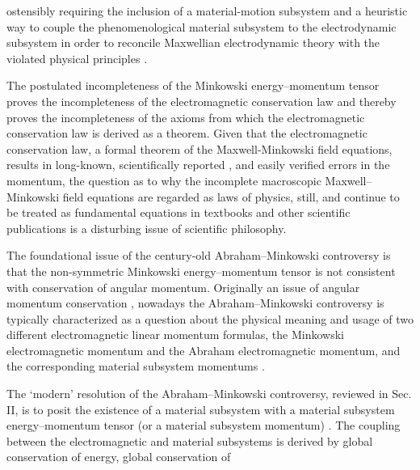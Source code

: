\documentclass[twocolumn,amssymb,eqsecnum,aps,pra]{revtex4-2}
\begin{document}
ostensibly requiring the inclusion of a material-motion subsystem and a
heuristic way to couple the phenomenological material subsystem to the
electrodynamic subsystem in order to reconcile Maxwellian electrodynamic
theory with the violated physical principles 
\cite{BIRL,BIBoydMil,BIPfei,BIAMC4,BIKemplatest,BIPenHaus,BIGord,BIBarn,BIBarnLou,BIKranys,BIObukPLA,BIBrevCons}.
\par
The postulated incompleteness of the Minkowski energy--momentum
tensor proves the incompleteness of the electromagnetic conservation
law and thereby proves the incompleteness of the axioms from which the 
electromagnetic conservation law is derived as a theorem.
Given that the electromagnetic conservation law, a formal theorem
of the Maxwell-Minkowski field equations, results in
long-known, scientifically reported
\cite{BIRL,BIBoydMil,BIPfei,BIAMC4,BIKemplatest,BIPenHaus,BIGord,BIBarn,BIBarnLou,BIKranys,BIObukPLA,BIBrevCons},
and easily verified errors in the momentum, the question as to
why the incomplete macroscopic Maxwell--Minkowski field equations are
regarded as laws of physics, still, and continue to be treated as
fundamental equations in textbooks and other scientific publications
is a disturbing issue of scientific philosophy.
\par
The foundational issue \cite{BIMin,BIAbr} of the century-old
Abraham--Minkowski controversy
\cite{BIRL,BIBoydMil,BIPfei,BIAMC4,BIKemplatest,BIPenHaus,BIGord,BIBarn,BIBarnLou,BIKranys,BIObukPLA,BIBrevCons}
is that the non-symmetric Minkowski energy--momentum tensor
is not consistent with conservation of angular momentum.
Originally an issue of angular momentum
conservation \cite{BIMin,BIAbr}, nowadays the Abraham--Minkowski
controversy is typically characterized as a question about the
physical meaning and usage of two different electromagnetic linear 
momentum formulas, the Minkowski electromagnetic momentum and the
Abraham electromagnetic momentum, and the corresponding material
subsystem momentums
\cite{BIRL,BIBoydMil,BIPfei,BIAMC4,BIKemplatest,BIPenHaus,BIGord,BIBarn,BIBarnLou,BIKranys,BIObukPLA,BIBrevCons,BIBrev}.
\par
The `modern' resolution of the Abraham--Minkowski controversy,
reviewed in Sec. II, is to
posit the existence of a material subsystem with a material subsystem 
energy--momentum tensor (or a material subsystem momentum)
\cite{BIRL,BIBoydMil,BIPfei,BIAMC4,BIKemplatest,BIPenHaus,BIGord,BIBarn,BIBarnLou,BIKranys,BIObukPLA,BIBrevCons}.
The coupling between the electromagnetic and material subsystems is
derived by global conservation of energy, global conservation of
\end{document}
